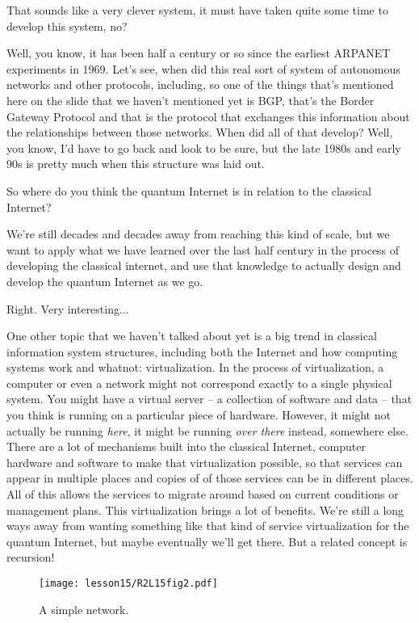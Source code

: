 \mmm That sounds like a very clever system, it must have taken quite some time to develop this system, no?

\rrr Well, you know, it has been half a century or so since the earliest ARPANET experiments in 1969.  Let's see, when did this real sort of system of autonomous networks and other protocols, including, so one of the things that's mentioned here on the slide that we haven't mentioned yet is BGP, that's the Border Gateway Protocol and that is the protocol that exchanges this information about the relationships between those networks. When did all of that develop? Well, you know, I'd have to go back and look to be sure, but the late 1980s and early 90s is pretty much when this structure was laid out.

\mmm So where do you think the quantum Internet is in relation to the classical Internet?

\rrr We're still decades and decades away from reaching this kind of scale, but we want to apply what we have learned over the last half century in the process of developing the classical internet, and use that knowledge to actually design and develop the quantum Internet as we go.

\mmm Right. Very interesting...

\rrr One other topic that we haven't talked about yet is a big trend in classical information system structures, including both the Internet and how computing systems work and whatnot: virtualization. In the process of virtualization, a computer or even a network might not correspond exactly to a single physical system. You might have a virtual server -- a collection of software and data -- that you think is running on a particular piece of hardware.  However, it might not actually be running \emph{here}, it might be running \emph{over there} instead, somewhere else. There are a lot of mechanisms built into the classical Internet, computer hardware and software to make that virtualization possible, so that services can appear in multiple places and copies of of those services can be in different places. All of this allows the services to migrate around based on current conditions or management plans. This virtualization brings a lot of benefits. We're still a long ways away from wanting something like that kind of service virtualization for the quantum Internet, but maybe eventually we'll get there. But a related concept is recursion!


\begin{figure}[t]
    \centering
    \texttt{[image: lesson15/R2L15fig2.pdf]}
    \caption[A simple network]{A simple network.}
    \label{fig:15-2-simple}
\end{figure}

